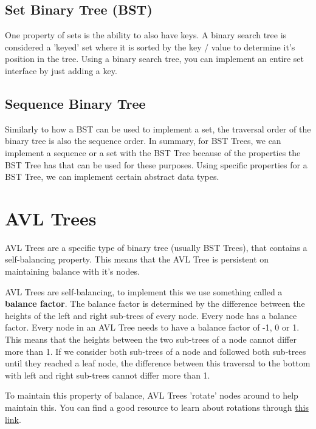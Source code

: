 \documentclass[11pt,a4paper,english]{report}
\begin{document}
\bigskip
\subsection{Set Binary Tree (BST)} 

One property of sets is the ability to also have keys. A binary search tree is considered a 'keyed' set where it is sorted by the key / value to determine it's position in the tree. Using a binary search tree, you can implement an entire set interface by just adding a key.

\subsection{Sequence Binary Tree}

Similarly to how a BST can be used to implement a set, the traversal order of the binary tree is also the sequence order. In summary, for BST Trees, we can implement a sequence or a set with the BST Tree because of the properties the BST Tree has that can be used for these purposes. Using specific properties for a BST Tree, we can implement certain abstract data types. 



\section{AVL Trees}

AVL Trees are a specific type of binary tree (usually BST Trees), that contains a self-balancing property. This means that the AVL Tree is persistent on maintaining balance with it's nodes.

\bigskip
\noindent
AVL Trees are self-balancing, to implement this we use something called a \textbf{balance factor}. The balance factor is determined by the difference between the heights of the left and right sub-trees of every node. Every node has a balance factor. Every node in an AVL Tree needs to have a balance factor of -1, 0 or 1. This means that the heights between the two sub-trees of a node cannot differ more than 1. If we consider both sub-trees of a node and followed both sub-trees until they reached a leaf node, the difference between this traversal to the bottom with left and right sub-trees cannot differ more than 1.

\bigskip
\noindent
To maintain this property of balance, AVL Trees 'rotate' nodes around to help maintain this.  You can find a good resource to learn about rotations through \href{https://www.programiz.com/dsa/avl-tree}{this link}.
\end{document}
